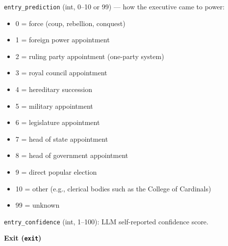\documentclass[11pt, a4paper]{article}
\newenvironment{promptquote}{%
  \begin{quote}\small
}{%
  \end{quote}
}
\begin{document}
\texttt{entry\_prediction} (int, 0--10 or 99) --- how the executive came to power:
\begin{itemize}[nosep, leftmargin=1.7em]
  \item 0 = force (coup, rebellion, conquest)
  \item 1 = foreign power appointment
  \item 2 = ruling party appointment (one-party system)
  \item 3 = royal council appointment
  \item 4 = hereditary succession
  \item 5 = military appointment
  \item 6 = legislature appointment
  \item 7 = head of state appointment
  \item 8 = head of government appointment
  \item 9 = direct popular election
  \item 10 = other (e.g., clerical bodies such as the College of Cardinals)
  \item 99 = unknown
\end{itemize}
\texttt{entry\_confidence} (int, 1--100): LLM self-reported confidence score.

\bigskip
\textbf{Exit (\texttt{exit})}


\end{document}
